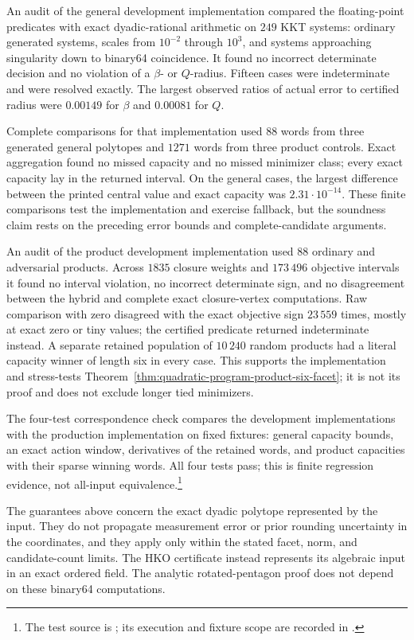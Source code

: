 An audit of the general development implementation compared the floating-point
predicates with exact dyadic-rational arithmetic on \(249\) KKT systems: ordinary generated systems,
scales from \(10^{-2}\) through \(10^3\), and systems approaching singularity
down to binary64 coincidence.  It found no incorrect determinate decision and
no violation of a \(\beta\)- or \(Q\)-radius.  Fifteen cases were
indeterminate and were resolved exactly.  The largest observed ratios of
actual error to certified radius were \(0.00149\) for \(\beta\) and
\(0.00081\) for \(Q\).

Complete comparisons for that implementation used \(88\) words from three
generated general polytopes and \(1271\) words from three product controls. Exact aggregation
found no missed capacity and no missed minimizer class; every exact capacity
lay in the returned interval.  On the general cases, the largest difference
between the printed central value and exact capacity was \(2.31\cdot10^{-14}\).
These finite comparisons test the implementation and exercise fallback, but
the soundness claim rests on the preceding error bounds and complete-candidate
arguments.

An audit of the product development implementation used \(88\) ordinary and
adversarial products. Across
\(1835\) closure weights and \(173\,496\) objective intervals it found no
interval violation, no incorrect determinate sign, and no disagreement between
the hybrid and complete exact closure-vertex computations.  Raw comparison
with zero disagreed with the exact objective sign \(23\,559\) times, mostly at
exact zero or tiny values; the certified predicate returned indeterminate
instead.  A separate retained population of \(10\,240\) random products had a
literal capacity winner of length six in every case.  This supports the
implementation and stress-tests
Theorem~\ref{thm:quadratic-program-product-six-facet}; it is not its proof and
does not exclude longer tied minimizers.

The four-test correspondence check compares the development implementations
with the production implementation on fixed fixtures: general capacity bounds,
an exact action window, derivatives of the retained words, and product capacities
with their sparse winning words. All four tests pass; this is finite regression
evidence, not all-input equivalence.\footnote{The test source is
;
its execution and fixture scope are recorded in
.}

The guarantees above concern the exact dyadic polytope represented by the
input.  They do not propagate measurement error or prior rounding uncertainty
in the coordinates, and they apply only within the stated facet, norm, and
candidate-count limits.  The HKO certificate instead represents its algebraic input in an exact
ordered field.  The analytic rotated-pentagon proof does not depend on
these binary64 computations.
